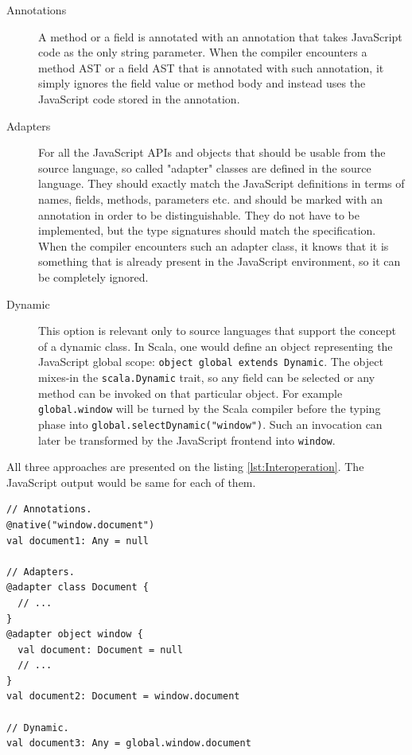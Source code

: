 \documentclass[12pt,a4paper]{report}
\begin{document}
\begin{description}
\item[Annotations] A method or a field is annotated with an annotation that takes JavaScript code as the only string parameter. When the compiler encounters a method AST or a field AST that is annotated with such annotation, it simply ignores the field value or method body and instead uses the JavaScript code stored in the annotation.
\item[Adapters] For all the JavaScript APIs and objects that should be usable from the source language, so called "adapter" classes are defined in the source language. They should exactly match the JavaScript definitions in terms of names, fields, methods, parameters etc. and should be marked with an annotation in order to be distinguishable. They do not have to be implemented, but the type signatures should match the specification. When the compiler encounters such an adapter class, it knows that it is something that is already present in the JavaScript environment, so it can be completely ignored. 
\item[Dynamic] This option is relevant only to source languages that support the concept of a dynamic class. In Scala, one would define an object representing the JavaScript global scope: \texttt{object global extends Dynamic}. The object mixes-in the \texttt{scala.Dynamic}\cite{ScalaDynamic} trait, so any field can be selected or any method can be invoked on that particular object. For example \texttt{global.window} will be turned by the Scala compiler before the typing phase into \texttt{global.selectDynamic("window")}. Such an invocation can later be transformed by the JavaScript frontend into \texttt{window}.
\end{description}

All three approaches are presented on the listing \ref{lst:Interoperation}. The JavaScript output would be same for each of them.

\begin{lstlisting}[frame=single,caption={Scala interoperation options.},label={lst:Interoperation}]
// Annotations.
@native("window.document")
val document1: Any = null

// Adapters.
@adapter class Document {
  // ...
}
@adapter object window {
  val document: Document = null
  // ...
} 
val document2: Document = window.document

// Dynamic.
val document3: Any = global.window.document
\end{lstlisting}
\end{document}
